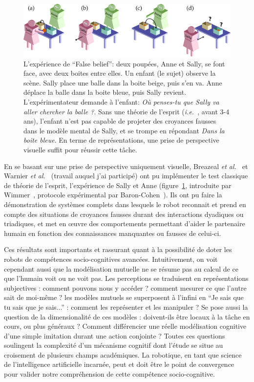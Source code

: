\documentclass[a4paper]{article}
\newcommand{\etal}{{\textit{et al.~}}}
\newcommand{\ie}{{\textit{i.e.~}}}
\begin{document}
\begin{figure}[h!t]
        \centering
        \includegraphics[width=1.0\linewidth]{sally_ann}
        \caption{\small L'expérience de ``False belief'': deux poupées, Anne
            et Sally, se font face, avec deux boites entre elles. Un enfant
            (le sujet) observe la scène. Sally place une balle dans la boite
            beige, puis s'en va. Anne déplace la balle dans la boite bleue, puis
            Sally revient. L'expérimentateur demande à l'enfant: \emph{Où
            penses-tu que Sally va aller chercher la balle ?}. Sans une théorie
            de l'esprit (\ie, avant 3-4 ans), l'enfant n'est pas capable de
            projeter des croyances fausses dans le modèle mental de Sally, et se
            trompe en répondant \emph{Dans la boite bleue}. En terme de
            représentations, une prise de perspective visuelle suffit pour
            réussir cette tâche.}
        \label{false-beliefs}
\end{figure}

En se basant sur une prise de perspective uniquement visuelle, Breazeal
\etal\cite{breazeal2009embodied} et Warnier \etal\cite{warnier2012when} (travail
auquel j'ai participé) ont pu implémenter le test classique de théorie de
l'esprit, l'expérience de Sally et Anne (figure~\ref{false-beliefs}, introduite
par Wimmer~\cite{wimmer1983beliefs}, protocole expérimental par
Baron-Cohen~\cite{baron1985does}). Ils ont pu faire la démonstration de systèmes
complets dans lesquels le robot reconnait et prend en compte des
situations de croyances fausses durant des interactions dyadiques ou triadiques,
et met en \oe uvre des comportements permettant d'aider le partenaire humain en
fonction des connaissances manquantes ou fausses de celui-ci.

Ces résultats sont importants et rassurant quant à la possibilité de doter les
robots de compétences socio-cognitives avancées. Intuitivement, on voit
cependant aussi que la modélisation mutuelle ne se résume pas au calcul de ce
que l'humain voit ou ne voit pas. Les perceptions se traduisent en
représentations subjectives : comment pouvons nous y accéder ? comment mesurer
ce que l'autre sait de moi-même ? les modèles mutuels se superposent à l'infini
en ``Je sais que tu sais que je sais...'' : comment les représenter et
les manipuler ? Se pose aussi la question de la dimensionalité de ces modèles :
doivent-ils être locaux à la tâche en cours, ou plus généraux ? Comment
différencier une réelle modélisation cognitive d'une simple imitation durant une
action conjointe ? Toutes ces questions soulingent la complexité d'un mécanisme
cognitif dont l'étude se situe au croisement de plusieurs champs académiques. La
robotique, en tant que science de l'intelligence artificielle incarnée, peut et
doit être le point de convergence pour valider notre compréhension de cette
compétence socio-cognitive.
\end{document}

